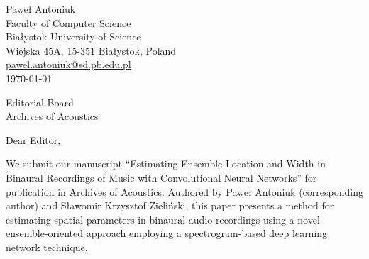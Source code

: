 \documentclass[a4paper,12pt]{article}
\begin{document}

\begin{flushright}
  Paweł Antoniuk \\
  Faculty of Computer Science \\
  Białystok University of Science \\
  Wiejska 45A, 15-351 Białystok, Poland \\
  \href{mailto:pawel.antoniuk@sd.pb.edu.pl}{pawel.antoniuk@sd.pb.edu.pl} \\
  \vspace{0.5cm}
  \today
\end{flushright}

\vspace{1cm}

\noindent
Editorial Board \\
Archives of Acoustics

\vspace{1cm}

\noindent
Dear Editor,

We submit our manuscript ``Estimating Ensemble Location and Width in Binaural Recordings of Music with Convolutional Neural Networks'' for publication in Archives of Acoustics. Authored by Paweł Antoniuk (corresponding author) and Sławomir Krzysztof Zieliński, this paper presents a method for estimating spatial parameters in binaural audio recordings using a novel ensemble-oriented approach employing a spectrogram-based deep learning network technique.
\end{document}
